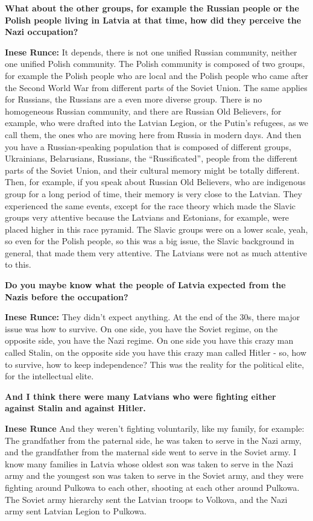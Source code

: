 \textbf{What about the other groups, for example the Russian people or the Polish people living in Latvia at that time, how did they perceive the Nazi occupation?}

\textbf{Inese Runce:} It depends, there is not one unified Russian community, neither one unified Polish community. The Polish community is composed of two groups, for example the Polish people who are local and the Polish people who came after the Second World War from different parts of the Soviet Union. The same applies for Russians, the Russians are a even more diverse group. There is no homogeneous Russian community, and there are Russian Old Believers, for example, who were drafted into the Latvian Legion, or the Putin's refugees, as we call them, the ones who are moving here from Russia in modern days. And then you have a Russian-speaking population that is composed of different groups, Ukrainians, Belarusians, Russians, the ``Russificated'', people from the different parts of the Soviet Union, and their cultural memory might be totally different. Then, for example, if you speak about Russian Old Believers, who are indigenous group for a long period of time, their memory is very close to the Latvian. They experienced the same events, except for the race theory which made the Slavic groups very attentive because the Latvians and Estonians, for example, were placed higher in this race pyramid. The Slavic groups were on a lower scale, yeah, so even for the Polish people, so this was a big issue, the Slavic background in general, that made them very attentive. The Latvians were not as much attentive to this.

\textbf{Do you maybe know what the people of Latvia expected from the Nazis before the occupation?}

\textbf{Inese Runce:} They didn't expect anything. At the end of the 30s, there major issue was how to survive. On one side, you have the Soviet regime, on the opposite side, you have the Nazi regime. On one side you have this crazy man called Stalin, on the opposite side you have this crazy man called Hitler - so, how to survive, how to keep independence?  This was the reality for the political elite, for the intellectual elite. 

\textbf{And I think there were many Latvians who were fighting either against Stalin and against Hitler.} 

\textbf{Inese Runce} And they weren't fighting voluntarily, like my family, for example: The grandfather from the paternal side, he was taken to serve in the Nazi army, and the grandfather from the maternal side went to serve in the Soviet army. I know many families in Latvia whose oldest son was taken to serve in the Nazi army and the youngest son was taken to serve in the Soviet army, and they were fighting around Pulkowa to each other, shooting at each other around Pulkowa. The Soviet army hierarchy sent the Latvian troops to Volkova, and the Nazi army sent Latvian Legion to Pulkowa.

